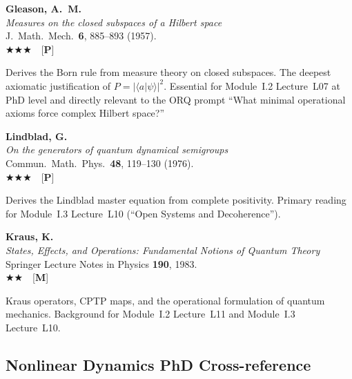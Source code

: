 \documentclass[11pt,a4paper]{article}
\newcommand{\essential}{$\bigstar\bigstar\bigstar$}
\newcommand{\recommended}{$\bigstar\bigstar$}
\newenvironment{bibentry}[1]{%
  \begin{tcolorbox}[entrybox=#1, top=4pt, bottom=4pt]%
}{%
  \end{tcolorbox}\smallskip%
}
\begin{document}
\begin{bibentry}{t5light}
\textbf{Gleason, A.~M.}\\
\textit{Measures on the closed subspaces of a Hilbert space}\\
J.~Math.~Mech.~\textbf{6}, 885--893 (1957).\\[4pt]
\essential\ \ [\textbf{P}]\\[4pt]
\begin{tcolorbox}[annotbox]
Derives the Born rule from measure theory on closed subspaces. The deepest
axiomatic justification of $P=|\langle a|\psi\rangle|^2$. Essential for
Module~I.2 Lecture~L07 at PhD level and directly relevant to the ORQ prompt
``What minimal operational axioms force complex Hilbert space?''
\end{tcolorbox}
\end{bibentry}

\begin{bibentry}{t5light}
\textbf{Lindblad, G.}\\
\textit{On the generators of quantum dynamical semigroups}\\
Commun.~Math.~Phys.~\textbf{48}, 119--130 (1976).\\[4pt]
\essential\ \ [\textbf{P}]\\[4pt]
\begin{tcolorbox}[annotbox]
Derives the Lindblad master equation from complete positivity. Primary reading
for Module~I.3 Lecture~L10 (``Open Systems and Decoherence'').
\end{tcolorbox}
\end{bibentry}

\begin{bibentry}{t5light}
\textbf{Kraus, K.}\\
\textit{States, Effects, and Operations: Fundamental Notions of Quantum Theory}\\
Springer Lecture Notes in Physics \textbf{190}, 1983.\\[4pt]
\recommended\ \ [\textbf{M}]\\[4pt]
\begin{tcolorbox}[annotbox]
Kraus operators, CPTP maps, and the operational formulation of quantum mechanics.
Background for Module~I.2 Lecture~L11 and Module~I.3 Lecture~L10.
\end{tcolorbox}
\end{bibentry}

\subsection{Nonlinear Dynamics PhD Cross-reference}
\end{document}
